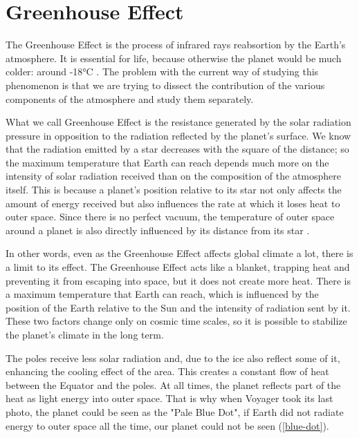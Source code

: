 \chapter[Greenhouse Effect]{Greenhouse Effect}

The Greenhouse Effect is the process of infrared rays reabsortion by the Earth's atmosphere. It is essential for life, because otherwise the planet would be much colder: around -18°C \cite{Nasa-cold}. The problem with the current way of studying this phenomenon is that we are trying to dissect the contribution of the various components of the atmosphere and study them separately.

What we call Greenhouse Effect is the resistance generated by the solar radiation pressure in opposition to the radiation reflected by the planet's surface. We know that the radiation emitted by a star decreases with the square of the distance; so the maximum temperature that Earth can reach depends much more on the intensity of solar radiation received than on the composition of the atmosphere itself. This is because a planet's position relative to its star not only affects the amount of energy received but also influences the rate at which it loses heat to outer space. Since there is no perfect vacuum, the temperature of outer space around a planet is also directly influenced by its distance from its star \cite{Cosmic-wave}.

In other words, even as the Greenhouse Effect affects global climate a lot, there is a limit to its effect. The Greenhouse Effect acts like a blanket, trapping heat and preventing it from escaping into space, but it does not create more heat.  There is a maximum temperature that Earth can reach, which is influenced by the position of the Earth relative to the Sun and the intensity of radiation sent by it. These two factors change only on cosmic time scales, so it is possible to stabilize the planet's climate in the long term.

The poles receive less solar radiation and, due to the ice also reflect some of it, enhancing the cooling effect of the area. This creates a constant flow of heat between the Equator and the poles. At all times, the planet reflects part of the heat as light energy into outer space. That is why when Voyager took its last photo, the planet could be seen as the "Pale Blue Dot", if Earth did not radiate energy to outer space all the time, our planet could not be seen (\autoref{blue-dot}).


